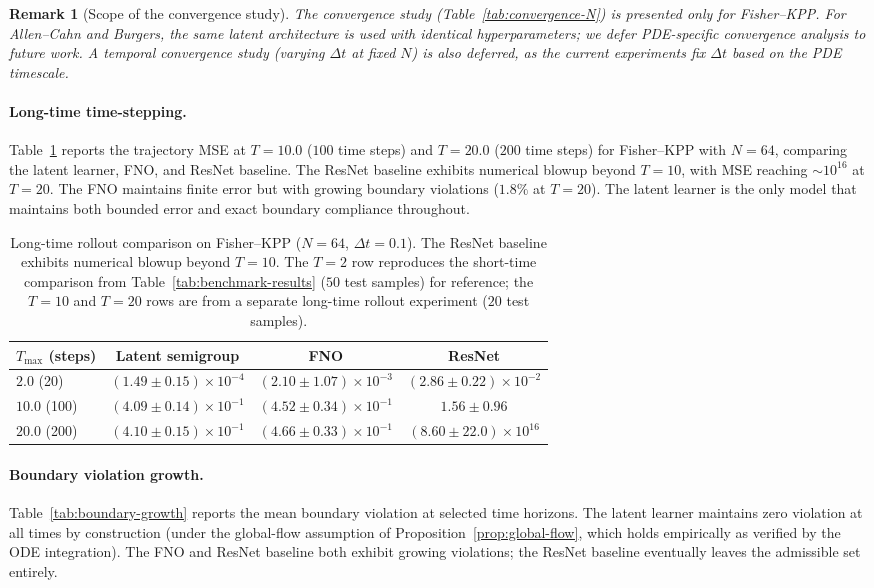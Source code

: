 \documentclass[11pt]{article}
\newtheorem{remark}{Remark}
\begin{document}
\begin{remark}[Scope of the convergence study]
The convergence study (Table~\ref{tab:convergence-N}) is presented only for Fisher--KPP. For Allen--Cahn and Burgers, the same latent architecture is used with identical hyperparameters; we defer PDE-specific convergence analysis to future work. A temporal convergence study (varying $\Delta t$ at fixed $N$) is also deferred, as the current experiments fix $\Delta t$ based on the PDE timescale.
\end{remark}

\paragraph{Long-time time-stepping.}
Table~\ref{tab:long-time} reports the trajectory MSE at $T=10.0$ ($100$ time steps) and $T=20.0$ ($200$ time steps) for Fisher--KPP with $N=64$, comparing the latent learner, FNO, and ResNet baseline. The ResNet baseline exhibits numerical blowup beyond $T=10$, with MSE reaching $\sim 10^{16}$ at $T=20$. The FNO maintains finite error but with growing boundary violations ($1.8\%$ at $T=20$). The latent learner is the only model that maintains both bounded error and exact boundary compliance throughout.

\begin{table}[htbp]
\centering
\caption{Long-time rollout comparison on Fisher--KPP ($N=64$, $\Delta t=0.1$). The ResNet baseline exhibits numerical blowup beyond $T=10$. The $T{=}2$ row reproduces the short-time comparison from Table~\ref{tab:benchmark-results} ($50$ test samples) for reference; the $T{=}10$ and $T{=}20$ rows are from a separate long-time rollout experiment ($20$ test samples).}
\label{tab:long-time}
\small
\begin{tabular}{@{}lccc@{}}
\hline
$T_{\max}$ (steps) & Latent semigroup & FNO & ResNet \\
\hline
$2.0$ (20) & $(1.49\pm 0.15)\times10^{-4}$ & $(2.10\pm 1.07)\times10^{-3}$ & $(2.86\pm 0.22)\times10^{-2}$ \\
$10.0$ (100) & $(4.09\pm 0.14)\times10^{-1}$ & $(4.52\pm 0.34)\times10^{-1}$ & $1.56\pm 0.96$ \\
$20.0$ (200) & $(4.10\pm 0.15)\times10^{-1}$ & $(4.66\pm 0.33)\times10^{-1}$ & $(8.60\pm 22.0)\times10^{16}$ \\
\hline
\end{tabular}
\end{table}

\paragraph{Boundary violation growth.}
Table~\ref{tab:boundary-growth} reports the mean boundary violation at selected time horizons. The latent learner maintains zero violation at all times by construction (under the global-flow assumption of Proposition~\ref{prop:global-flow}, which holds empirically as verified by the ODE integration). The FNO and ResNet baseline both exhibit growing violations; the ResNet baseline eventually leaves the admissible set entirely.
\end{document}
